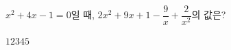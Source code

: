 $x^2+4x-1=0$일 때, $2x^2+9x+1-\dfrac{9}{x}+\dfrac{2}{x^2}$의 값은?
\begin{choices32}{$1$}{$2$}{$3$}{$4$}{$5$}\end{choices32}
